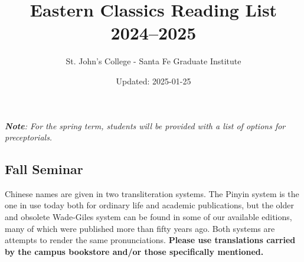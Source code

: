 \documentclass{article}
\title{Eastern Classics Reading List 2024--2025}
\author{St. John's College - Santa Fe Graduate Institute}
\date{Updated: 2025-01-25}
\newcounter{cntSemester} %
\begin{document}
\maketitle

\renewcommand*\contentsname{Reading Lists}
\tableofcontents

\vspace{11mm}
\textit{\textbf{Note}: For the spring term, students will be provided with a list of options for preceptorials.}

\thispagestyle{fancy} %


\clearpage

\begin{center}
	\section{Fall Seminar}
\end{center}

Chinese names are given in two transliteration systems.
The Pinyin system is the one in use today both for ordinary life and academic publications, but the older and obsolete Wade-Giles system can be found in some of our available editions, many of which were published more than fifty years ago.
Both systems are attempts to render the same pronunciations.
\textbf{Please use translations carried by the campus bookstore and/or those specifically mentioned.}
\end{document}
